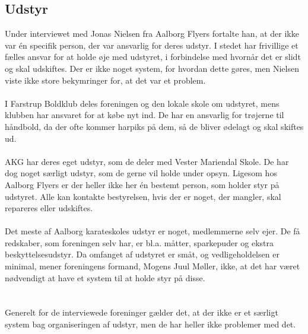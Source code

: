 \subsection*{Udstyr}
Under interviewet med Jonas Nielsen fra Aalborg Flyers fortalte han, at der ikke var én specifik person, der var ansvarlig for deres udstyr. I stedet har frivillige et fælles ansvar for at holde øje med udstyret, i forbindelse med hvornår det er slidt og skal udskiftes. Der er ikke noget system, for hvordan dette gøres, men Nielsen viste ikke store bekymringer for, at det var et problem.
\\\\
I Farstrup Boldklub deles foreningen og den lokale skole om udstyret, mens klubben har ansvaret for at købe nyt ind. De har en ansvarlig for trøjerne til håndbold, da der ofte kommer harpiks på dem, så de bliver ødelagt og skal skiftes ud.
\\\\
AKG har deres eget udstyr, som de deler med Vester Mariendal Skole. De har dog noget særligt udstyr, som de gerne vil holde under opsyn. Ligesom hos Aalborg Flyers er der heller ikke her én bestemt person, som holder styr på udstyret. Alle kan kontakte bestyrelsen, hvis der er noget, der mangler, skal repareres eller udskiftes. 
\\\\
\clearpage
Det meste af Aalborg karateskoles udstyr er noget, medlemmerne selv ejer. De få redskaber, som foreningen selv har, er bl.a. måtter, sparkepuder og ekstra beskyttelsesudstyr. Da omfanget af udstyret er småt, og vedligeholdelsen er minimal, mener foreningens formand, Mogens Juul Møller, ikke, at det har været nødvendigt at have et system til at holde styr på disse.
\\\\\\
Generelt for de interviewede foreninger gælder det, at der ikke er et særligt system bag organiseringen af udstyr, men de har heller ikke problemer med det. 

